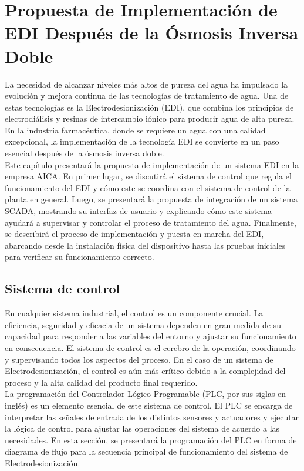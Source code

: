 \chapter{Propuesta de Implementación de EDI Después de la Ósmosis Inversa Doble}
\label{cap:propuesta_implementacion}

La necesidad de alcanzar niveles más altos de pureza del agua ha impulsado
la evolución y mejora continua de las tecnologías de tratamiento de agua.
Una de estas tecnologías es la Electrodesionización (EDI), que combina
los principios de electrodiálisis y resinas de intercambio iónico para
producir agua de alta pureza. En la industria farmacéutica, donde se
requiere un agua con una calidad excepcional, la implementación de la
tecnología EDI se convierte en un paso esencial después de la ósmosis inversa doble.\\

Este capítulo presentará la propuesta de implementación de un sistema
EDI en la empresa AICA. En primer lugar, se discutirá el sistema de
control que regula el funcionamiento del EDI y cómo este se coordina
con el sistema de control de la planta en general.
Luego, se presentará la propuesta de integración de un sistema SCADA,
mostrando su interfaz de usuario y explicando cómo este sistema
ayudará a supervisar y controlar el proceso de tratamiento del agua.
Finalmente, se describirá el proceso de implementación y puesta en marcha del
EDI, abarcando desde la instalación física del dispositivo hasta las pruebas
iniciales para verificar su funcionamiento correcto.

\section{Sistema de control}
\label{sec:sistema_control}

En cualquier sistema industrial, el control es un componente crucial. La eficiencia, seguridad y eficacia de un sistema dependen en gran medida de su capacidad para responder a las variables del entorno y ajustar su funcionamiento en consecuencia. El sistema de control es el cerebro de la operación, coordinando y supervisando todos los aspectos del proceso. En el caso de un sistema de Electrodesionización, el control es aún más crítico debido a la complejidad del proceso y la alta calidad del producto final requerido.\\

La programación del Controlador Lógico Programable (PLC, por sus siglas en inglés) es un elemento esencial de este sistema de control. El PLC se encarga de interpretar las señales de entrada de los distintos sensores y actuadores y ejecutar la lógica de control para ajustar las operaciones del sistema de acuerdo a las necesidades. En esta sección, se presentará la programación del PLC en forma de diagrama de flujo para la secuencia principal de funcionamiento del sistema de Electrodesionización.\\

